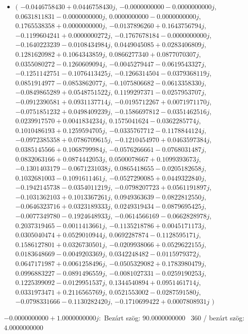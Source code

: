 \documentclass[14pt,a4paper]{article}
\begin{document}
\begin{itemize}
\item
$\big($
$-0.0446758430+0.0446758430j$, $-0.0000000000-0.0000000000j$, $0.0631811831-0.0000000000j$, $0.0000000000-0.0000000000j$, $0.1765538358+0.0000000000j$, $-0.0137896260+0.1643756794j$, $-0.1199604241+0.0000000272j$, $-0.1767678184-0.0000000000j$, $-0.1640223239-0.0108434984j$, $0.0449045085+0.0283406809j$, $0.1281620982+0.1064343859j$, $0.0866277340+0.0877070307j$, $0.0355080272-0.1260609094j$, $-0.0045279447-0.0619543327j$, $-0.1251142751-0.1076413425j$, $-0.1266314504-0.0379368119j$, $0.0851914977-0.0853862077j$, $-0.1075806682-0.0613358330j$, $-0.0849865289+0.0548751522j$, $0.1199297371-0.0257953707j$, $-0.0912390581+0.0931137714j$, $-0.0195712267+0.0071971170j$, $-0.0751851232+0.0498409239j$, $-0.1586697812-0.0351462516j$, $0.0239917570+0.0041834234j$, $0.1575041624-0.0362285774j$, $0.1010486193+0.1259594705j$, $-0.0335767712-0.1178844124j$, $-0.0972385358+0.0786709615j$, $-0.1210454970+0.0463597384j$, $0.0385145566+0.1068799984j$, $-0.0576266661-0.0768031487j$, $0.0832063166+0.0874442053j$, $0.0500078667+0.1099393673j$, $-0.1301403179-0.0671231038j$, $0.0865418655-0.0205182658j$, $0.1032681003-0.1091611461j$, $-0.0527290085+0.0449322840j$, $-0.1942145738-0.0354011219j$, $-0.0798207723+0.0561191897j$, $-0.1031362103+0.1013367261j$, $0.0949363639-0.0822812550j$, $-0.0646323716+0.0323189333j$, $0.0249319434-0.0879695425j$, $-0.0077349780-0.1924648933j$, $-0.0614566169-0.0662828978j$, $0.2037319465-0.0011413661j$, $-0.1135218786+0.0045171173j$, $0.0305040474+0.0529010944j$, $0.0692287874-0.1128595171j$, $0.1586127801+0.0326730501j$, $-0.0209938066+0.0529622155j$, $0.0183648669-0.0049203369j$, $0.0342248482-0.0115979372j$, $0.0647171987+0.0061258496j$, $-0.0505329082+0.1783980479j$, $0.0996883227-0.0891496559j$, $-0.0081027331-0.0259190253j$, $0.1225399092-0.0129951537j$, $0.1344540894+0.0951461714j$, $0.0331973471+0.2116565769j$, $0.0521553002-0.0287591580j$, $-0.0798331666-0.1130282420j$, $-0.1710699422+0.0007808931j$
$\big)$
\end{itemize}
$-0.0000000000+1.0000000000j$:\
Bezárt szög: $90.0000000000$ \
360 / bezárt szög: $4.0000000000$\
\end{document}
